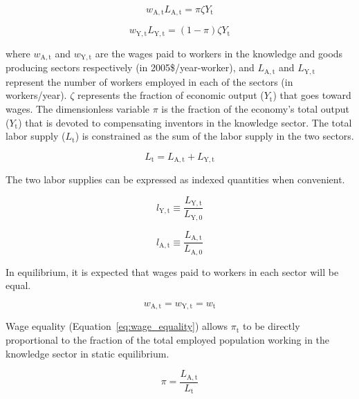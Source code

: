 \documentclass[letterpaper,12pt]{article}
\begin{document}
\begin{equation} \label{eq:knowledge_comp}
	w_\mathrm{A,t} L_\mathrm{A,t} = \pi \zeta Y_\mathrm{t}
\end{equation}

\begin{equation} \label{eq:labor_comp}
	w_\mathrm{Y,t} L_\mathrm{Y,t} = (1-\pi) \zeta Y_\mathrm{t}
\end{equation}

\noindent where $w_\mathrm{A,t}$ and $w_\mathrm{Y,t}$ are the wages paid to workers in the knowledge and goods producing sectors respectively (in 2005\$/year-worker), and $L_\mathrm{A,t}$ and $L_\mathrm{Y,t}$ represent the number of workers employed in each of the sectors (in workers/year). $\zeta$ represents the fraction of economic output ($Y_\mathrm{t}$) that goes toward wages. The dimensionless variable $\pi$ is the fraction of the economy's total output ($Y_\mathrm{t}$) that is devoted to compensating inventors in the knowledge sector. The total labor supply ($L_\mathrm{t}$) is constrained as the sum of the labor supply in the two sectors.

\begin{equation} \label{eq:labor_supply}
	L_\mathrm{t} = L_\mathrm{A,t} + L_\mathrm{Y,t}
\end{equation}

The two labor supplies can be expressed as indexed quantities when convenient.

\begin{equation}
	l_\mathrm{Y,t} \equiv \frac{L_\mathrm{Y,t}}{L_\mathrm{Y,0}}
\end{equation}

\begin{equation}
	l_\mathrm{A,t} \equiv \frac{L_\mathrm{A,t}}{L_\mathrm{A,0}}
\end{equation}

In equilibrium, it is expected that wages paid to workers in each sector will be equal.

\begin{equation} \label{eq:wage_equality}
	w_\mathrm{A,t} = w_\mathrm{Y,t} = w_\mathrm{t}
\end{equation}

Wage equality (Equation~\ref{eq:wage_equality}) allows $\pi_\mathrm{t}$ to be directly proportional to the fraction of the total employed population working in the knowledge sector in static equilibrium.

\begin{equation} \label{eq:pi}
	\pi = \frac{L_\mathrm{A,t}}{L_\mathrm{t}}
\end{equation}
\end{document}
